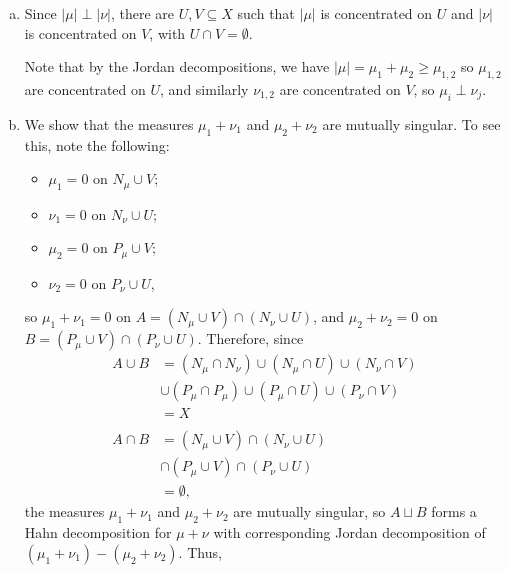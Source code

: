 \documentclass[10pt]{mypackage}
\begin{document}
\begin{enumerate}[(a)]
  \item Since $\left\vert \mu \right\vert\perp \left\vert \nu \right\vert$, there are $U,V\subseteq X$ such that $\left\vert \mu \right\vert$ is concentrated on $U$ and $\left\vert \nu \right\vert$ is concentrated on $V$, with $U\cap V = \emptyset$.\newline

    Note that by the Jordan decompositions, we have $\left\vert \mu \right\vert = \mu_1 + \mu_2 \geq \mu_{1,2}$ so $\mu_{1,2}$ are concentrated on $U$, and similarly $\nu_{1,2}$ are concentrated on $V$, so $\mu_{i}\perp \nu_{j}$.
  \item We show that the measures $\mu_1 + \nu_1$ and $\mu_2 + \nu_2$ are mutually singular. To see this, note the following:
    \begin{itemize}
      \item $\mu_1 = 0$ on $N_{\mu}\cup V$;
      \item $\nu_1 = 0$ on $N_{\nu}\cup U$;
      \item $\mu_2 = 0$ on $P_{\mu}\cup V$;
      \item $\nu_2 = 0$ on $P_{\nu}\cup U$,
    \end{itemize}
    so $\mu_1 + \nu_1 = 0$ on $A = \left( N_{\mu}\cup V \right) \cap \left( N_{\nu}\cup U \right)$, and $\mu_2 + \nu_2 = 0$ on $B = \left( P_{\mu}\cup V \right)\cap \left( P_{\nu}\cup U \right)$. Therefore, since
    \begin{align*}
      A\cup B &= \left( N_{\mu}\cap N_{\nu} \right) \cup \left( N_{\mu}\cap U \right) \cup \left( N_{\nu}\cap V \right)\\
              &\cup \left( P_{\mu}\cap P_{\mu} \right) \cup \left( P_{\mu}\cap U \right) \cup \left( P_{\nu}\cap V \right)\\
              &= X\\
              \\
      A\cap B &= \left( N_{\mu}\cup V \right)\cap \left( N_{\nu}\cup U \right)\\
              &\cap \left( P_{\mu}\cup V \right) \cap \left( P_{\nu}\cup U \right)\\
              &= \emptyset,
    \end{align*}
    the measures $\mu_1 + \nu_1$ and $\mu_2 + \nu_2$ are mutually singular, so $A\sqcup B$ forms a Hahn decomposition for $\mu + \nu$ with corresponding Jordan decomposition of $\left( \mu_1 + \nu_1 \right) - \left( \mu_2 + \nu_2 \right)$. Thus,
    \begin{align*}

\end{align*}
\end{enumerate}
\end{document}

